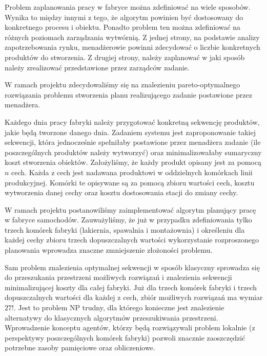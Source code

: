 Problem zaplanowania pracy w fabryce można zdefiniować na wiele sposobów. Wynika to między innymi z tego, że algorytm powinien być dostosowany do konkretnego procesu i obiektu. Ponadto problem ten można zdefiniować na różnych poziomach zarządzania wytwórnią. Z jednej strony, na podstawie analizy zapotrzebowania rynku, menadżerowie powinni zdecydować o liczbie konkretnych produktów do stworzenia. Z drugiej strony, należy zaplanować w jaki sposób należy zrealizować przedstawione przez zarządców zadanie.

W ramach projektu zdecydowaliśmy się na znalezieniu pareto-optymalnego rozwiązania problemu stworzenia planu realizującego zadanie postawione przez menadżera. 

Każdego dnia pracy fabryki należy przygotować konkretną sekwencję produktów, jakie będą tworzone danego dnia. Zadaniem systemu jest zaproponowanie takiej sekwencji, która jednocześnie spełniłaby postawione przez menadżera zadanie (ile poszczególnych produktów należy wytworzyć) oraz minimalizowałaby sumaryczny koszt stworzenia obiektów. Założyliśmy, że każdy produkt opisany jest za pomocą $n$ cech. Każda z cech jest nadawana produktowi w oddzielnych komórkach linii produkcyjnej. Komórki te opisywane są za pomocą zbioru wartości cech, kosztu wytworzenia danej cechy oraz kosztu dostosowania stacji do zmiany cechy.

W ramach projektu postanowiliśmy zaimplementować algorytm planujący pracę w fabryce samochodów. Zauważyliśmy, że już w przypadku zdefiniowania tylko trzech komórek fabryki (lakiernia, spawalnia i montażownia) i określeniu dla każdej cechy zbioru trzech dopuszczalnych wartości wykorzystanie rozproszonego planowania wprowadza znaczne zmniejszenie złożoności problemu. 

Sam problem znalezienia optymalnej sekwencji w sposób klasyczny sprowadza się do przeszukania przestrzeni możliwych rozwiązań i znalezienia sekwencji minimalizującej koszty dla całej fabryki. Już dla trzech komórek fabryki i trzech dopuszczalnych wartości dla każdej z cech, zbiór możliwych rozwiązań ma wymiar $27!$. Jest to problem NP trudny, dla którego konieczne jest znalezienie alternatywy do klasycznych algorytmów przeszukiwania przestrzeni. Wprowadzenie konceptu agentów, którzy będą rozwiązywali problem lokalnie (z perspektywy poszczególnych komórek fabryki) pozwoli znacznie zaoszczędzić potrzebne zasoby pamięciowe oraz obliczeniowe.